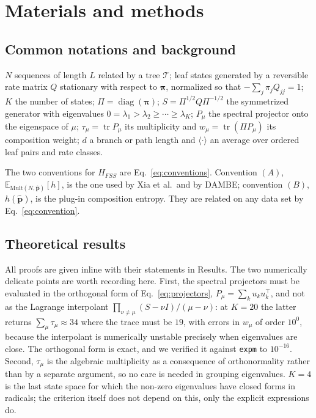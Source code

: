 \documentclass[preprint,12pt,authoryear]{elsarticle}
\newcommand{\HFSS}{H_{FSS}}
\newcommand{\bpi}{\boldsymbol{\pi}}
\newcommand{\tr}{\operatorname{tr}}
\newcommand{\E}{\mathbb{E}}
\newcommand{\Mult}{\mathrm{Mult}}
\theoremstyle{definition}
\theoremstyle{remark}
\begin{document}

\section{Materials and methods}

\subsection{Common notations and background}
\label{sec:notation}

$N$ sequences of length $L$ related by a tree $\mathcal T$; leaf states
generated by a reversible rate matrix $Q$ stationary with respect to $\bpi$,
normalized so that $-\sum_j\pi_jQ_{jj}=1$; $K$ the number of states;
$\Pi=\operatorname{diag}(\bpi)$; $S=\Pi^{1/2}Q\Pi^{-1/2}$ the symmetrized
generator with eigenvalues $0=\lambda_1>\lambda_2\ge\cdots\ge\lambda_K$;
$P_\mu$ the spectral projector onto the eigenspace of $\mu$;
$\tau_\mu=\tr P_\mu$ its multiplicity and $w_\mu=\tr(\Pi P_\mu)$ its
composition weight; $d$ a branch or path length and
$\langle\cdot\rangle$ an average over ordered leaf pairs and rate classes.

The two conventions for $\HFSS$ are Eq.~\eqref{eq:conventions}. Convention
$(A)$, $\E_{\Mult(N,\hat{\mathbf p})}[h]$, is the one used by Xia et al.\ and
by DAMBE; convention $(B)$, $h(\hat{\mathbf p})$, is the plug-in composition
entropy. They are related on any data set by Eq.~\eqref{eq:convention}.

\subsection{Theoretical results}

All proofs are given inline with their statements in Results. The two
numerically delicate points are worth recording here. First, the spectral
projectors must be evaluated in the orthogonal form of
Eq.~\eqref{eq:projectors}, $P_\mu=\sum_k u_ku_k^{\!\top}$, and not as the
Lagrange interpolant $\prod_{\nu\ne\mu}(S-\nu I)/(\mu-\nu)$: at $K=20$ the
latter returns $\sum_\mu\tau_\mu\approx34$ where the trace must be $19$, with
errors in $w_\mu$ of order $10^0$, because the interpolant is numerically
unstable precisely when eigenvalues are close. The orthogonal form is exact,
and we verified it against \texttt{expm} to $10^{-16}$. Second, $\tau_\mu$ is
the algebraic multiplicity as a consequence of orthonormality rather than by
a separate argument, so no care is needed in grouping eigenvalues. $K=4$ is
the last state space for which the non-zero eigenvalues have closed forms in
radicals; the criterion itself does not depend on this, only the explicit
expressions do.
\end{document}
